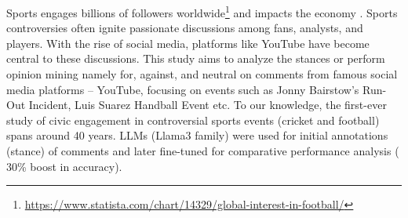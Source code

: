 \documentclass[sigconf, review]{acmart}
\begin{document}


Sports engages billions of followers worldwide\footnote{\url{https://www.statista.com/chart/14329/global-interest-in-football/}} 
and impacts the economy \cite{sportseconomics20221}. Sports controversies often ignite passionate discussions among fans, analysts, and players. With the rise of social media, platforms like YouTube have become central to these discussions. This study aims to analyze the stances or perform opinion mining namely for, against, and neutral on comments from famous social media platforms -- YouTube, focusing on events such as Jonny Bairstow's Run-Out Incident, Luis Suarez Handball Event etc.
To our knowledge, the first-ever study of civic engagement in controversial sports events (cricket and football) spans around 40 years. LLMs (Llama3 family) were used for initial annotations (stance) of comments and later fine-tuned for comparative performance analysis ($~$30\% boost in accuracy).

\end{document}
